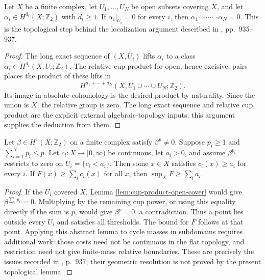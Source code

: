\begin{lemma}\label{lem:cup-product-open-cover}
Let $X$ be a finite complex, let $U_1,\ldots,U_N$ be open subsets covering $X$, and let $\alpha_i\in H^{d_i}(X;\mathbb Z_2)$ with $d_i\geq1$. If $\alpha_i|_{U_i}=0$ for every $i$, then $\alpha_1\smile\cdots\smile\alpha_N=0$. This is the topological step behind the localization argument described in \cite{LMN}, pp.~935--937.
\end{lemma}
\begin{proof}
The long exact sequence of $(X,U_i)$ lifts $\alpha_i$ to a class $\widetilde\alpha_i\in H^{d_i}(X,U_i;\mathbb Z_2)$. The relative cup product for open, hence excisive, pairs places the product of these lifts in
\[
 H^{d_1+\cdots+d_N}(X,U_1\cup\cdots\cup U_N;\mathbb Z_2).
\]
Its image in absolute cohomology is the desired product by naturality. Since the union is $X$, the relative group is zero. The long exact sequence and relative cup product are the explicit external algebraic-topology inputs; this argument supplies the deduction from them.
\end{proof}

\begin{proposition}\label{prop:cup-length-cost-thresholds}
Let $\beta\in H^1(X;\mathbb Z_2)$ on a finite complex satisfy $\beta^p\ne0$. Suppose $p_i\geq1$ and $\sum_{i=1}^N p_i\leq p$. Let $c_i:X\to[0,\infty)$ be continuous, let $a_i>0$, and assume $\beta^{p_i}$ restricts to zero on $U_i=\{c_i<a_i\}$. Then some $x\in X$ satisfies $c_i(x)\geq a_i$ for every $i$. If $F(x)\geq\sum_i c_i(x)$ for all $x$, then $\sup_XF\geq\sum_i a_i$.
\end{proposition}
\begin{proof}
If the $U_i$ covered $X$, Lemma \ref{lem:cup-product-open-cover} would give $\beta^{\sum_i p_i}=0$. Multiplying by the remaining cup power, or using this equality directly if the sum is $p$, would give $\beta^p=0$, a contradiction. Thus a point lies outside every $U_i$ and satisfies all thresholds. The bound for $F$ follows at that point. Applying this abstract lemma to cycle masses in subdomains requires additional work: those costs need not be continuous in the flat topology, and restriction need not give finite-mass relative boundaries. These are precisely the issues recorded in \cite{LMN}, p.~937; their geometric resolution is not proved by the present topological lemma.
\end{proof}
